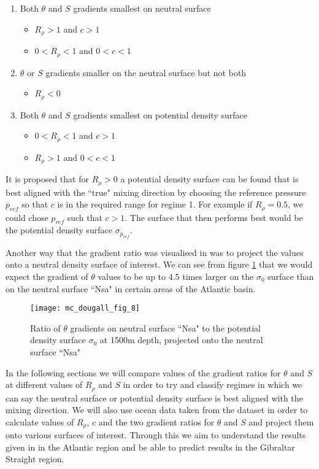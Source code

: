 \begin{enumerate}
    \item Both $\theta$ and $S$ gradients smallest on neutral surface
        \begin{itemize}
            \item $R_\rho>1$ and $c>1$
            \item $0<R_\rho<1$ and $0<c<1$
        \end{itemize}
    \item $\theta$ or $S$ gradients smaller on the neutral surface but not both
         \begin{itemize}
            \item $R_\rho<0$
        \end{itemize}
    \item Both $\theta$ and $S$ gradients smallest on potential density surface
         \begin{itemize}
            \item $0<R_\rho<1$ and $c>1$
            \item $R_\rho>1$ and $0<c<1$
        \end{itemize}
\end{enumerate}

It is proposed that for $R_\rho>0$ a potential density surface can be found that is best aligned with the ``true" mixing direction by choosing the reference pressure $p_{ref}$ so that $c$ is in the required range for regime 1. For example if $R_\rho = 0.5$, we could chose $p_{ref}$ such that $c>1$. The surface that then performs best would be the potential density surface $\sigma_{p_{ref}}$.

Another way that the gradient ratio was visualised in \citet{McDougall1987} was to project the values onto a neutral density surface of interest. We can see from figure \ref{fig:gradient_Theory_mcdougall_fig_8} that we would expect the gradient of $\theta$ values to be up to 4.5 times larger on the $\sigma_0$ surface than on the neutral surface ``Nsa" in certain areas of the Atlantic basin.  

\begin{figure}[htbp]
    \centering
    \texttt{[image: mc\_dougall\_fig\_8]}
    \caption{Ratio of $\theta$ gradients on neutral surface ``Nsa" to the potential density surface $\sigma_0$ at 1500m depth, projected onto the neutral surface ``Nsa" \citep{McDougall1987}}
    \label{fig:gradient_Theory_mcdougall_fig_8}
\end{figure}

In the following sections we will compare values of the gradient ratios for $\theta$ and $S$ at different values of $R_\rho$ and $S$ in order to try and classify regimes in which we can say the neutral surface or potential density surface is best aligned with the mixing direction. We will also use ocean data taken from the \citet{WOCE2002} dataset in order to calculate values of $R_\rho$, $c$ and the two gradient ratios for $\theta$ and $S$ and project them onto various surfaces of interest. Through this we aim to understand the results given in \citet{McDougall1987} in the Atlantic region and be able to predict results in the Gibraltar Straight region. 
